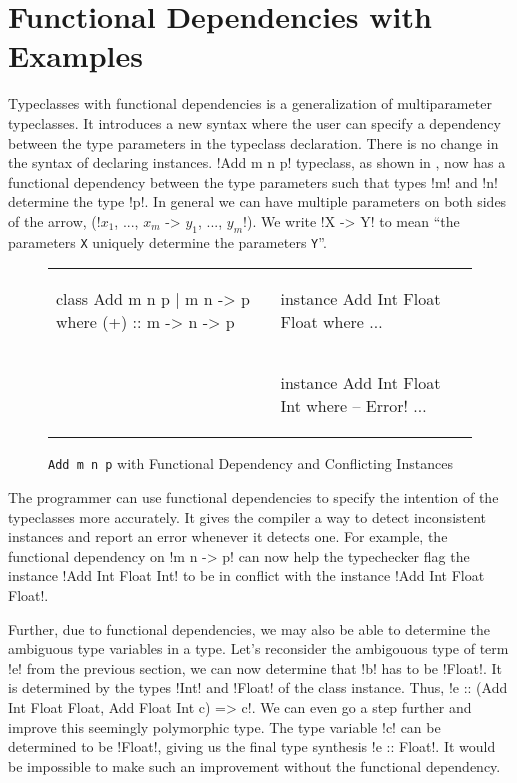 \documentclass[format=acmsmall,manuscript,review,screen,nonacm,margin=1in,11pt]{acmart}
\begin{document}
\section{Functional Dependencies with Examples}\label{sec:fd}
Typeclasses with functional dependencies\cite{jones_tcfd_2000} is a generalization of multiparameter typeclasses.
It introduces a new syntax where the user can specify a dependency between the type parameters
in the typeclass declaration. There is no change in the syntax of declaring instances.
!Add m n p! typeclass, as shown in , now has a functional dependency
between the type parameters such that types !m! and !n! determine the type !p!.
In general we can have multiple parameters on both sides of the arrow,
(!$x_1$, ..., $x_m$ -> $y_1$, ..., $y_m$!). We write !X -> Y! to mean
``the parameters \texttt{X} uniquely determine the parameters \texttt{Y}''.

\begin{figure}[h t]
  \footnotesize
  \begin{tabular}{l l}
\begin{code}
class Add m n p | m n -> p where
  (+) :: m -> n -> p
\end{code}&%
\begin{code}
instance Add Int Float Float where
  $\ldots$
\end{code}\\
          &
\begin{code}
instance Add Int Float Int where -- Error!
  $\ldots$
\end{code}
  \end{tabular}
  \caption{\texttt{Add m n p} with Functional Dependency and Conflicting Instances}
  \label{fig:add-tc-fd}
\end{figure}

The programmer can use functional dependencies to specify the intention of the typeclasses
more accurately. It gives the compiler a way to detect inconsistent instances and report an error
whenever it detects one. For example, the functional dependency on !m n -> p!
can now help the typechecker flag the instance !Add Int Float Int! to be in conflict with the instance
!Add Int Float Float!.

Further, due to functional dependencies,
we may also be able to determine the ambiguous type variables in a type.
Let's reconsider the ambigouous type of term !e! from the previous section, we can now determine
that !b! has to be !Float!. It is determined by the types !Int! and !Float! of the class instance.
Thus, !e :: (Add Int Float Float, Add Float Int c) => c!.
We can even go a step further and improve this seemingly polymorphic type.
The type variable !c! can be determined to be !Float!, giving us the final type synthesis !e :: Float!.
It would be impossible to make such an improvement without the functional dependency.
\end{document}
